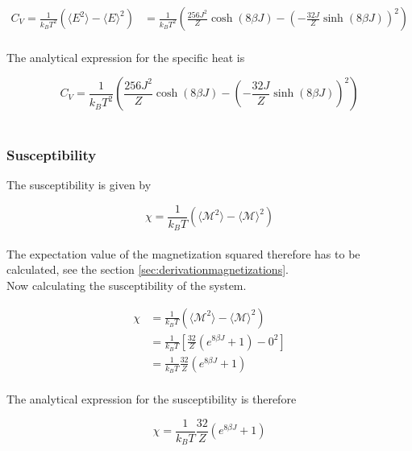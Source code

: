 \documentclass{article}
\begin{document}
\begin{align*}
    C_V = \frac{1}{k_B T^2} \left( \langle E^2 \rangle - \langle E \rangle ^2 \right)
    &= \frac{1}{k_B T^2} \left( \frac{256 J^2}{Z} \cosh (8 \beta J) - \left( - \frac{32 J}{Z} \sinh(8 \beta J ) \right) ^2 \right)
\end{align*} \\

The analytical expression for the specific heat is

\begin{equation} \label{eq:finalspecificheat}
    C_V = \frac{1}{k_B T^2} \left( \frac{256 J^2}{Z} \cosh (8 \beta J) - \left( - \frac{32 J}{Z} \sinh(8 \beta J ) \right) ^2 \right)
\end{equation} \\


\subsubsection{Susceptibility} \label{sec:susceptibility}

The susceptibility is given by

\begin{equation}    \label{eq:susceptibility}
    \chi = \frac{1}{k_B T} \left( \langle \mathcal{M}^2 \rangle - \langle \mathcal{M} \rangle ^2 \right)
\end{equation} \\

The expectation value of the magnetization squared therefore has to be calculated, see the section \ref{sec:derivationmagnetizations}. \\

Now calculating the susceptibility of the system.

\begin{align*}
    \chi &= \frac{1}{k_B T} \left( \langle \mathcal{M}^2 \rangle - \langle \mathcal{M} \rangle ^2 \right) \\
    &= \frac{1}{k_B T} \left[ \frac{32}{Z} \left( e^{8 \beta J} + 1 \right) - 0^2 \right] \\
    &= \frac{1}{k_B T} \frac{32}{Z} \left( e^{8 \beta J} + 1 \right) \\
\end{align*}

The analytical expression for the susceptibility is therefore

\begin{equation}    \label{eq:finalsusceptibility}
    \chi = \frac{1}{k_B T} \frac{32}{Z} \left( e^{8 \beta J} + 1 \right)
\end{equation} \\
\end{document}
